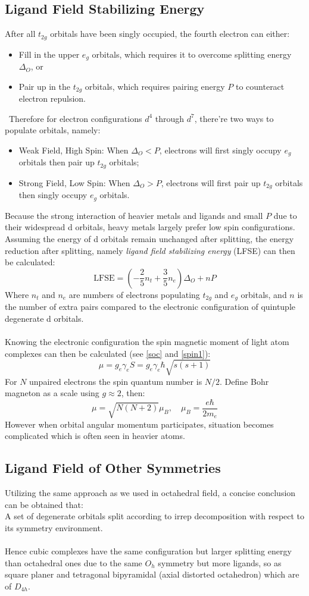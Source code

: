 \subsection{Ligand Field Stabilizing Energy}
%
After all $t_{2g}$ orbitals have been singly occupied, the fourth electron can either:
%
\begin{itemize}
	\item Fill in the upper $e_{g}$ orbitals, which requires it to overcome splitting energy $\Delta_O$, or
	\item Pair up in the $t_{2g}$ orbitals, which requires pairing energy $P$ to counteract electron repulsion.
\end{itemize}
\ 
Therefore for electron configurations $d^4$ through $d^7$, there're two ways to populate orbitals, namely:
%
\begin{itemize}
	\item Weak Field, High Spin: When $\Delta_O<P$, electrons will first singly occupy $e_g$ orbitals then pair up $t_{2g}$ orbitals;
	\item Strong Field, Low Spin: When $\Delta_O>P$, electrons will first pair up $t_{2g}$ orbitals then singly occupy $e_g$ orbitals.
\end{itemize}
%
Because the strong interaction of heavier metals and ligands and small $P$ due to their widespread d orbitals, 
heavy metals largely prefer low spin configurations.
Assuming the energy of d orbitals remain unchanged after splitting, 
the energy reduction after splitting, namely \emph{ligand field stabilizing energy} (LFSE) can then be calculated:
%
\[
	\text{LFSE}=(-\frac{2}{5}n_t+\frac{3}{5}n_e)\Delta_O +nP
\]
%
Where $n_t$ and $n_e$ are numbers of electrons populating $t_{2g}$ and $e_g$ orbitals, 
and $n$ is the number of extra pairs compared to the electronic configuration of quintuple degenerate d orbitals.\\ \\
% 
Knowing the electronic configuration the spin magnetic moment of light atom complexes can then be calculated (see \ref{soc} and \ref{spin1}):
%
\[
	\mu=g_e\gamma_eS=g_e\gamma_e\hbar\sqrt{s(s+1)}
\]
%
For $N$ unpaired electrons the spin quantum number is $N/2$. 
Define Bohr magneton as a scale using $g\approx2$, then:
%
\[
	\mu = \sqrt{N(N+2)}\mu_B, \quad \mu_B = \frac{e\hbar}{2m_e}
\]
%
However when orbital angular momentum participates, situation becomes complicated which is often seen in heavier atoms.
%
\subsection{Ligand Field of Other Symmetries}
%
Utilizing the same approach as we used in octahedral field, a concise conclusion can be obtained that:\\
A set of degenerate orbitals split according to irrep decomposition with respect to its symmetry environment.\\ \\
%
Hence cubic complexes have the same configuration but larger splitting energy than octahedral ones 
due to the same $O_h$ symmetry but more ligands, 
so as square planer and tetragonal bipyramidal (axial distorted octahedron) which are of $D_{4h}$.
%
